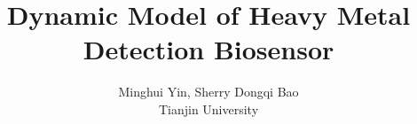 \documentclass[a4paper,10pt]{article}
\begin{document}
 
\title{Dynamic Model of Heavy Metal Detection Biosensor} \author{Minghui Yin, Sherry Dongqi Bao \\Tianjin University}
\maketitle 




\printbibliography
\end{document}
